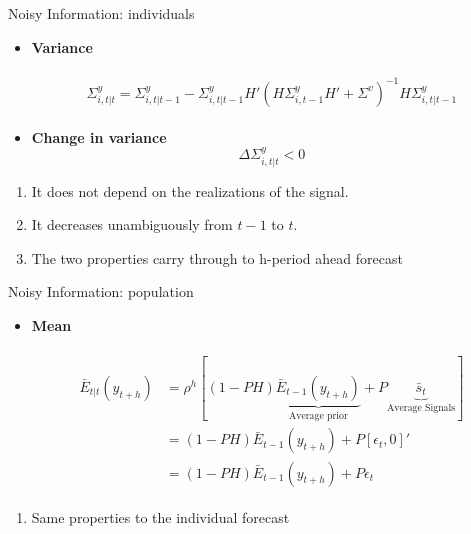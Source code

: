 \documentclass{beamer}
\begin{document}
\begin{frame}{Noisy Information: individuals}
\begin{itemize}
	\item \textbf{Variance}
	
	\begin{eqnarray*}
		\begin{aligned}
			\Sigma^y_{i,t|t} = \Sigma^y_{i,t|t-1} - \Sigma^y_{i,t|t-1} H'(H \Sigma^y_{i,t-1} H' +\Sigma^v) ^{-1}H \Sigma^y_{i,t|t-1} 
		\end{aligned}
	\end{eqnarray*}
	\item \textbf{Change in variance} 
	$$\Delta \Sigma^y_{i,t|t} <0$$
	
\end{itemize}
\begin{enumerate}
	\item It does not depend on the realizations of the signal. 
	\item It decreases unambiguously from $t-1$ to $t$. 
	\item The two properties carry through to h-period ahead forecast 
\end{enumerate}

\end{frame}


\begin{frame}{Noisy Information: population}
\begin{itemize}
\item \textbf{Mean}

\begin{eqnarray*}
	\begin{aligned}
		\bar E_{t|t} (y_{t+h}) & = \rho^h [(1-PH) \underbrace{\bar E_{t-1}(y_{t+h})}_{\text{Average prior}} + P \underbrace{\bar s_{t}}_{\text{Average Signals}}] \\
		& = (1-PH) \bar E_{t-1}(y_{t+h}) + P [\epsilon_t, 0]' \\
		& = (1-PH) \bar E_{t-1}(y_{t+h}) + P \epsilon_t
	\end{aligned}
\end{eqnarray*}
\end{itemize}

\begin{enumerate}
	\item Same properties to the individual forecast 
\end{enumerate}

\end{frame}
\end{document}
